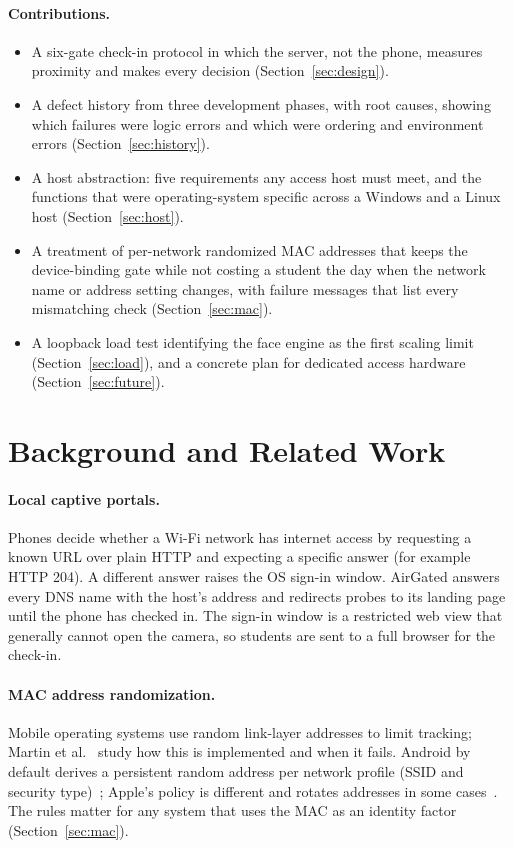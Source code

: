 \documentclass[11pt,a4paper]{article}
\newcommand{\sys}{AirGated}
\begin{document}
\paragraph{Contributions.}
\begin{itemize}[leftmargin=*,itemsep=2pt]
\item A six-gate check-in protocol in which the server, not the phone, measures proximity and makes every decision (Section~\ref{sec:design}).
\item A defect history from three development phases, with root causes, showing which failures were logic errors and which were ordering and environment errors (Section~\ref{sec:history}).
\item A host abstraction: five requirements any access host must meet, and the functions that were operating-system specific across a Windows and a Linux host (Section~\ref{sec:host}).
\item A treatment of per-network randomized MAC addresses that keeps the device-binding gate while not costing a student the day when the network name or address setting changes, with failure messages that list every mismatching check (Section~\ref{sec:mac}).
\item A loopback load test identifying the face engine as the first scaling limit (Section~\ref{sec:load}), and a concrete plan for dedicated access hardware (Section~\ref{sec:future}).
\end{itemize}

\section{Background and Related Work}
\paragraph{Local captive portals.} Phones decide whether a Wi-Fi network has internet access by requesting a known URL over plain HTTP and expecting a specific answer (for example HTTP 204). A different answer raises the OS sign-in window. \sys{} answers every DNS name with the host's address and redirects probes to its landing page until the phone has checked in. The sign-in window is a restricted web view that generally cannot open the camera, so students are sent to a full browser for the check-in.

\paragraph{MAC address randomization.} Mobile operating systems use random link-layer addresses to limit tracking; Martin et al.~\cite{martin2017mac} study how this is implemented and when it fails. Android by default derives a persistent random address per network profile (SSID and security type)~\cite{androidmac}; Apple's policy is different and rotates addresses in some cases~\cite{applemac}. The rules matter for any system that uses the MAC as an identity factor (Section~\ref{sec:mac}).
\end{document}
